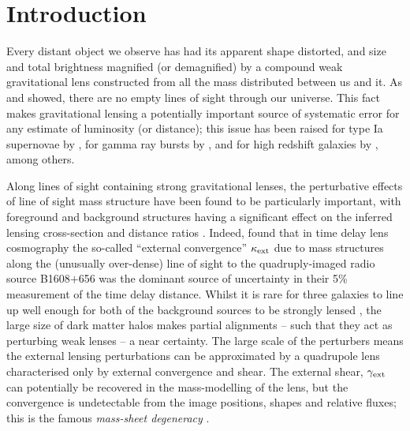 \documentclass[useAMS,usenatbib,a4paper]{mn2e}
\begin{document}
\setcounter{footnote}{1}


\section{Introduction}
\label{sec:intro}

Every distant object we observe has had its apparent shape distorted,
and size and total brightness magnified (or demagnified) by a compound
weak gravitational lens constructed from all the mass distributed
between us and it. As \citet{Vale+White2003} and \citet{HilbertEtal2007}
showed, there are no empty lines of sight through our universe. This
fact makes gravitational lensing a potentially important source of
systematic error for any estimate of luminosity (or distance); this 
issue has been 
raised for \eg type Ia supernovae by
\citet[][]{Holz+Wald1998,Holz+Linder2005}, for gamma ray bursts by
\citet[][]{Oguri+Takahashi2006,Wang+Dai2011},  and for high redshift
galaxies by \citet{BradacEtal2009}, among others. 

Along lines of sight containing strong gravitational lenses, the
perturbative effects of line of sight mass structure have been found to
be particularly important, with foreground and background structures
having a significant effect on the inferred lensing cross-section
\citep[\eg][]{WongEtal2012} and distance ratios
\citep[][]{DalalEtal2005}. Indeed, \citet{SuyuEtal2010} found that in
time delay lens cosmography the so-called ``external convergence''
$\kappa_{\rm ext}$ due to mass structures along the (unusually over-dense) line
of sight to the quadruply-imaged radio source B1608$+$656 was the
dominant source of uncertainty in their 5\% measurement of the time delay distance. 
Whilst it is rare for three galaxies to line up well enough for both of
the background sources to be strongly lensed \citep{GavazziEtal2008,CollettEtal2012a}, 
the large size of dark matter halos makes partial alignments -- such that they
act as perturbing weak lenses --  a near certainty. The large scale of the
perturbers means the external lensing perturbations can be approximated
by a quadrupole lens characterised only by external convergence and shear.
The external shear, $\gamma_{\rm ext}$ can potentially be recovered in the
mass-modelling of the lens, but the convergence is undetectable from the
image positions, shapes and relative fluxes; this is the famous {\emph{ 
mass-sheet degeneracy}} \citep[see e.g.][for details]{FalcoEtal1985}.
\end{document}
